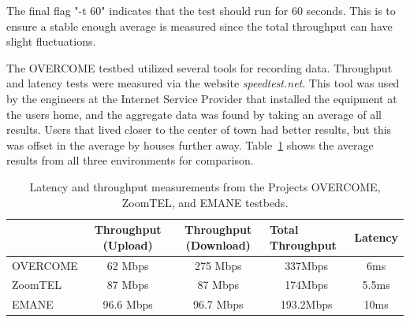 The final flag "-t 60" indicates that the test should run for 60 seconds. This is to ensure a stable enough average is measured since the total throughput can have slight fluctuations.\par
The OVERCOME testbed utilized several tools for recording data.
Throughput and latency tests were measured via the website \textit{speedtest.net}.
This tool was used by the engineers at the Internet Service Provider that installed the equipment at the users home, and the aggregate data was found by taking an average of all results.
Users that lived closer to the center of town had better results, but this was offset in the average by houses further away.
Table~\ref{chpt3_results} shows the average results from all three environments for comparison.\par

\begin{table}
\centering
\caption{Latency and throughput measurements from the Projects OVERCOME, ZoomTEL, and EMANE testbeds.}
\begin{adjustbox}{width=\textwidth, center=\textwidth}
    \begin{tabular}{l|cccc}
    \multicolumn{1}{c|}{} & Throughput (Upload) & Throughput (Download) & \multicolumn{1}{l}{Total Throughput} & Latency \\ 
    \hline
    OVERCOME & 62 Mbps & 275 Mbps & 337Mbps & 6ms \\
    ZoomTEL & 87 Mbps & 87 Mbps & 174Mbps & 5.5ms \\
    EMANE & 96.6 Mbps & 96.7 Mbps & 193.2Mbps & 10ms
    \end{tabular}
\end{adjustbox}
\label{chpt3_results}
\end{table}

